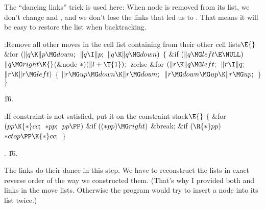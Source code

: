 The ``dancing links'' trick is used here: When node  is removed from
its list, we don't change  and , and we
don't lose the
links that led us to . That means it will be easy to restore the
list when backtracking.

\Y\B\4:Remove all other moves in the cell list containing  from
their other cell lists\X${}\E{}$\6
\&{for} ${}(\|q\K\|p\MG\\{down};{}$ ${}\|q\I\|p;{}$ ${}\|q\K\|q\MG\\{down}){}$\5
${}\{{}$\1\6
\&{if} ${}(\|q\MG\\{left}\E\NULL){}$\1\5
${}\|q\MG\\{right}\K{}$(\&{node} ${}{*})(\|l+\T{1});{}$\2\6
\&{else}\1\6
\&{for} ${}(\|r\K\|q\MG\\{left};{}$ ${}\|r\I\|q;{}$ ${}\|r\K\|r\MG\\{left}){}$\5
${}\{{}$\1\6
${}\|r\MG\\{up}\MG\\{down}\K\|r\MG\\{down};{}$\6
${}\|r\MG\\{down}\MG\\{up}\K\|r\MG\\{up};{}$\6
\4${}\}{}$\2\2\6
\4${}\}{}$\2\par
\U16.\fi

\B{}:If constraint  is not satisfied, put it on
the constraint stack\X${}\E{}$\6
${}\{{}$\1\6
\&{for} ${}(\\{pp}\K{*}\\{cc};{}$ ${}{*}\\{pp};{}$ ${}\\{pp}\PP){}$\1\6
\&{if} ${}(({*}\\{pp})\MG\\{right}){}$\1\5
\&{break};\2\2\6
\&{if} ${}(\R{*}\\{pp}){}$\1\5
${}{*}\\{ctop}\PP\K{*}\\{cc};{}$\2\6
\4${}\}{}$\2\par
{}.
\U16.\fi

The links do their dance in this step. We have to reconstruct the lists
in exact reverse order of the way we constructed them. (That's why I provided
both  and  links in the move lists. Otherwise the
program
would try to insert a node into its list twice.)

